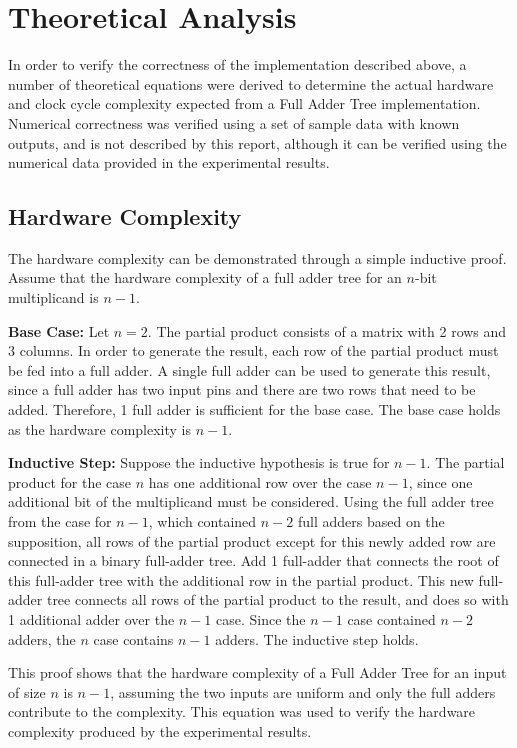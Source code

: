 \documentclass{article}
\begin{document}
\section{Theoretical Analysis}
In order to verify the correctness of the implementation described above, a number of theoretical equations were derived to determine the actual hardware and clock cycle complexity expected from a Full Adder Tree implementation. Numerical correctness was verified using a set of sample data with known outputs, and is not described by this report, although it can be verified using the numerical data provided in the experimental results.

\subsection{Hardware Complexity}
The hardware complexity can be demonstrated through a simple inductive proof. Assume that the hardware complexity of a full adder tree for an $n$-bit multiplicand is $n-1$.

\textbf{Base Case:} Let $n = 2$. The partial product consists of a matrix with 2 rows and 3 columns. In order to generate the result, each row of the partial product must be fed into a full adder. A single full adder can be used to generate this result, since a full adder has two input pins and there are two rows that need to be added. Therefore, 1 full adder is sufficient for the base case. The base case holds as the hardware complexity is $n-1$.

\textbf{Inductive Step:} Suppose the inductive hypothesis is true for $n-1$. The partial product for the case $n$ has one additional row over the case $n-1$, since one additional bit of the multiplicand must be considered. Using the full adder tree from the case for $n-1$, which contained $n-2$ full adders based on the supposition, all rows of the partial product except for this newly added row are connected in a binary full-adder tree. Add 1 full-adder that connects the root of this full-adder tree with the additional row in the partial product. This new full-adder tree connects all rows of the partial product to the result, and does so with 1 additional adder over the $n-1$ case. Since the $n-1$ case contained $n-2$ adders, the $n$ case contains $n-1$ adders. The inductive step holds.

This proof shows that the hardware complexity of a Full Adder Tree for an input of size $n$ is $n-1$, assuming the two inputs are uniform and only the full adders contribute to the complexity. This equation was used to verify the hardware complexity produced by the experimental results.
\end{document}
